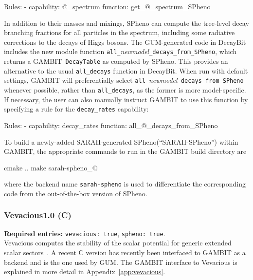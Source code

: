 \documentclass[pdftex,twocolumn,epjc3_preprint,runningheads]{svjour3}
\renewcommand{\_}{\discretionary{\underscore}{}{\underscore}}
\newcommand\cpp[1]{{\lstinline!#1!}}  %
\newcommand\term[1]{{\lstset{style=terminal}\lstinline!#1!\lstset{style=cpp}}}
\newcommand\guminline[1]{{{\lstset{style=gum}\lstinline!#1!}}}
\newcommand{\metavarf}[1]{\textit{\color{darkgreen}\footnotesize\textrm{#1}}}
\newcommand{\metavar}{\metavarf}
\newcommand{\gambit}{\textsf{GAMBIT}\xspace}
\newcommand{\decaybit}{\textsf{DecayBit}\xspace}
\newcommand{\GB}{\gambit}
\newcommand{\gum}{\textsf{GUM}\xspace}
\newcommand{\dgum}{\!\!\term{.gum}\!\xspace}
\newcommand{\sarah}{\textsf{SARAH}\xspace}
\newcommand{\veva}{\textsf{Vevacious}\xspace}
\newcommand{\spheno}{\textsf{SPheno}\xspace}
\newcommand\xx{\raisebox{0.2ex}{\smaller ++}\xspace}
\newcommand{\nm}{\metavar{new\_model}}
\begin{document}
\begin{lstyaml}
Rules:
  - capability: @\nm@_spectrum
    function:   get_@\nm@_spectrum_SPheno
\end{lstyaml}

In addition to their masses and mixings, \spheno can compute the tree-level decay branching fractions for all particles in the spectrum, including some radiative corrections to the decays of Higgs bosons. The \gum-generated code in \decaybit includes the new module function \cpp{all_}\nm\cpp{_decays_from_SPheno}, which returns a \gambit~\cpp{DecayTable} as computed by \spheno. This provides an alternative to the usual \cpp{all_decays} function in \decaybit.  When run with default settings, \gambit will preferentially select \cpp{all_}\nm\cpp{_decays_from_SPheno} whenever possible, rather than \cpp{all_decays}, as the former is more model-specific.  If necessary, the user can also manually instruct \gambit to use this function by specifying a rule for the \cpp{decay_rates} capability:
%
\begin{lstyaml}
Rules:
  - capability: decay_rates
    function:   all_@\nm@_decays_from_SPheno
\end{lstyaml}

To build a newly-added \sarah-generated \spheno (``\sarah-\spheno'') within \gambit, the appropriate commands to run in the \gambit build directory are
%
\begin{lstterm}
cmake ..
make sarah-spheno_@\nm@
\end{lstterm}
%
where the backend name \term{sarah-spheno} is used to differentiate the corresponding code from the out-of-the-box version of \spheno.

\subsubsection{\veva \textsf{1.0} (C\xx)} \label{sec:veva_desc}

\textbf{Required \dgum entries:} \guminline{vevacious: true}, \guminline{spheno: true}.\\

\veva computes the stability of the scalar potential for generic extended scalar sectors~\cite{Camargo-Molina:2013qva}. A recent C\xx version \cite{vevaciousgithub} has recently been interfaced to \GB as a backend \cite{VS_GUT} and is the one used by \gum. The \gambit interface to \veva is explained in more detail in Appendix~\ref{app:vevacious}.
\end{document}
